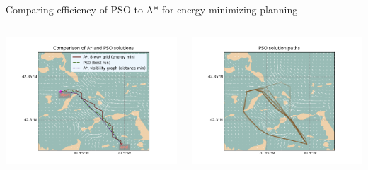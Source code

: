 \documentclass[9pt,xcolor=table]{beamer}
\begin{document}
\begin{frame}{Comparing efficiency of PSO to A* for energy-minimizing planning}
    \begin{columns}
        \begin{column}{0.5\textwidth}
            \includegraphics[width=\textwidth,trim={0cm 0cm 0cm 0cm},clip]{img/paths_FP2_compare.png}
        \end{column}
        \begin{column}{0.5\textwidth}
            \includegraphics[width=\textwidth,trim={0cm 0cm 0cm 0cm},clip]{img/paths_FP2_many.png}
        \end{column}        
    \end{columns}
    \begin{columns}

\end{columns}
\end{frame}
\end{document}
